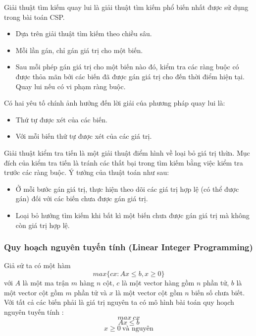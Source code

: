 \documentclass[a4paper,12pt]{report}
\begin{document}
Giải thuật tìm kiếm quay lui là giải thuật tìm kiếm phổ biến nhất được sử dụng trong bài toán CSP. 
\begin{itemize}
\item Dựa trên giải thuật tìm kiếm theo chiều sâu.
\item Mỗi lần gán, chỉ gán giá trị cho một biến.
\item Sau mỗi phép gán giá trị cho một biến nào đó, kiểm tra các ràng buộc có được thỏa mãn bới các biến đã được gán giá trị cho đến thời điểm hiện tại. Quay lui nếu có vi phạm ràng buộc. 
\end{itemize}
Có hai yêu tố chính ảnh hưởng đến lời giải cúa phương pháp quay lui là:
\begin{itemize}
\item Thứ tự được xét của các biến.
\item Với mỗi biến thứ tự được xét của các giá trị.

\end{itemize}

Giải thuật kiểm tra tiến là một giải thuật điểm hình về loại bỏ giá trị thừa. Mục đích của kiểm tra tiến là tránh các thất bại trong tìm kiếm bằng việc kiểm tra trước các ràng buộc. Ý tưởng của thuật toán như sau:
\begin{itemize}
\item Ở mỗi bước gán giá trị, thực hiện theo dõi các giá trị hợp lệ (có thể được gán) đối với các biến chưa được gán giá trị. 
\item Loại bỏ hướng tìm kiếm khi bất kì một biến chưa được gán giá trị mà không còn giá trị hợp lệ.
\end{itemize}

\subsubsection{Quy hoạch nguyên tuyến tính (Linear Integer Programming)}
Giả sử ta có một hàm $$max\{cx : Ax \leq b, x \geq 0\}$$ với $A$ là một ma trận $m$ hàng $n$ cột, $c$ là một vector hàng gồm $n$ phần tử, $b$ là một vector cột gồm $m$ phần tử và $x$ là một vector cột gồm $n$ biến số chưa biết.\\

 Với tất cả các biến phải là giá trị nguyên ta có mô hình bài toán quy hoạch nguyên tuyến tính\cite{IP} :
$$max \ cx$$
$$Ax \leq b$$
$$x \geq 0 \ \text{và nguyên}$$
\end{document}
